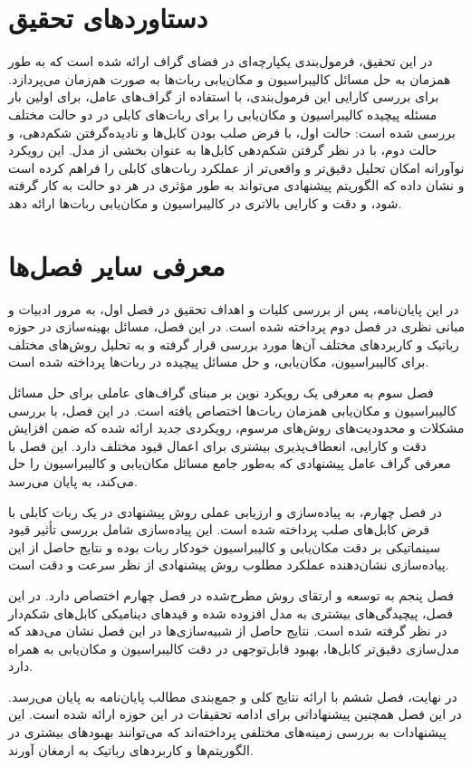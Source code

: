 \section{دستاورد‌های تحقیق}
در این تحقیق، فرمول‌بندی یکپارچه‌ای در فضای گراف ارائه شده است که به طور همزمان به حل مسائل کالیبراسیون و مکان‌یابی ربات‌ها به صورت هم‌زمان می‌پردازد. برای بررسی کارایی این فرمول‌بندی، با استفاده از گراف‌های عامل، برای اولین بار مسئله پیچیده کالیبراسیون و مکان‌یابی را برای ربات‌های کابلی در دو حالت مختلف بررسی شده است: حالت اول، با فرض صلب بودن کابل‌ها و نادیده‌گرفتن شکم‌دهی، و حالت دوم، با در نظر گرفتن شکم‌دهی کابل‌ها به عنوان بخشی از مدل. این رویکرد نوآورانه امکان تحلیل دقیق‌تر و واقعی‌تر از عملکرد ربات‌های کابلی را فراهم کرده است و نشان داده که الگوریتم پیشنهادی می‌تواند به طور مؤثری در هر دو حالت به کار گرفته شود، و دقت و کارایی بالاتری در کالیبراسیون و مکان‌یابی ربات‌ها ارائه دهد.

\section{معرفی سایر فصل‌ها}
در این پایان‌نامه، پس از بررسی کلیات و اهداف تحقیق در فصل اول، به مرور ادبیات و مبانی نظری در فصل دوم پرداخته‌ شده‌ است. در این فصل، مسائل بهینه‌سازی در حوزه رباتیک و کاربردهای مختلف آن‌ها مورد بررسی قرار گرفته و به تحلیل روش‌های مختلف برای کالیبراسیون، مکان‌یابی، و حل مسائل پیچیده در ربات‌ها پرداخته شده است.

فصل سوم به معرفی یک رویکرد نوین بر مبنای گراف‌های عاملی برای حل مسائل کالیبراسیون و مکان‌یابی همزمان ربات‌ها اختصاص یافته است. در این فصل، با بررسی مشکلات و محدودیت‌های روش‌های مرسوم، رویکردی جدید ارائه شده که ضمن افزایش دقت و کارایی، انعطاف‌پذیری بیشتری برای اعمال قیود مختلف دارد. این فصل با معرفی گراف عامل پیشنهادی که به‌طور جامع مسائل مکان‌یابی و کالیبراسیون را حل می‌کند، به پایان می‌رسد.

در فصل چهارم، به پیاده‌سازی و ارزیابی عملی روش پیشنهادی در یک ربات کابلی با فرض کابل‌های صلب پرداخته شده است. این پیاده‌سازی شامل بررسی تأثیر قیود سینماتیکی بر دقت مکان‌یابی و کالیبراسیون خودکار ربات بوده و نتایج حاصل از این پیاده‌سازی نشان‌دهنده عملکرد مطلوب روش پیشنهادی از نظر سرعت و دقت است.

فصل پنجم به توسعه و ارتقای روش مطرح‌شده در فصل چهارم اختصاص دارد. در این فصل، پیچیدگی‌های بیشتری به مدل افزوده شده و قیدهای دینامیکی کابل‌های شکم‌دار در نظر گرفته شده است. نتایج حاصل از شبیه‌سازی‌ها در این فصل نشان می‌دهد که مدل‌سازی دقیق‌تر کابل‌ها، بهبود قابل‌توجهی در دقت کالیبراسیون و مکان‌یابی به همراه دارد.

در نهایت، فصل ششم با ارائه نتایج کلی و جمع‌بندی مطالب پایان‌نامه به پایان می‌رسد. در این فصل همچنین پیشنهاداتی برای ادامه تحقیقات در این حوزه ارائه شده است. این پیشنهادات به بررسی زمینه‌های مختلفی پرداخته‌اند که می‌توانند بهبود‌های بیشتری در الگوریتم‌ها و کاربردهای رباتیک به ارمغان آورند.




